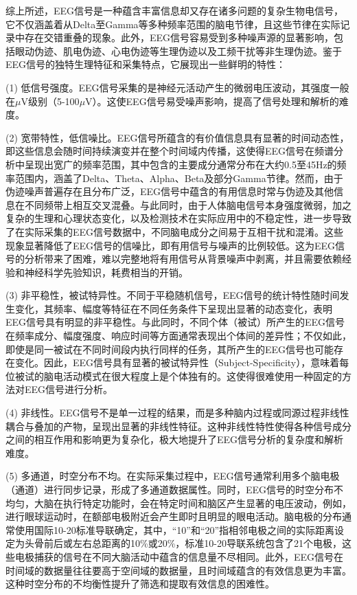 综上所述，EEG信号是一种蕴含丰富信息却又存在诸多问题的复杂生物电信号，它不仅涵盖着从Delta至Gamma等多种频率范围的脑电节律，且这些节律在实际记录中存在交错重叠的现象。此外，EEG信号容易受到多种噪声源的显著影响，包括眼动伪迹、肌电伪迹、心电伪迹等生理伪迹以及工频干扰等非生理伪迹。鉴于EEG信号的独特生理特征和采集特点，它展现出一些鲜明的特性：

(1) 低信号强度。EEG信号采集的是神经元活动产生的微弱电压波动，其强度一般在\(\mu\)V级别（5-100\(\mu\)V）\cite{SJCJ201505001}。这使EEG信号易受噪声影响，提高了信号处理和解析的难度。

(2) 宽带特性，低信噪比。EEG信号所蕴含的有价值信息具有显著的时间动态性，即这些信息会随时间持续演变并在整个时间域内传播，这使得EEG信号在频谱分析中呈现出宽广的频率范围，其中包含的主要成分通常分布在大约0.5至45Hz的频率范围内\cite{1022779250.nh}，涵盖了Delta、Theta、Alpha、Beta及部分Gamma节律。然而，由于伪迹噪声普遍存在且分布广泛，EEG信号中蕴含的有用信息时常与伪迹及其他信息在不同频带上相互交叉混叠。与此同时，由于人体脑电信号本身强度微弱，加之复杂的生理和心理状态变化，以及检测技术在实际应用中的不稳定性，进一步导致了在实际采集的EEG信号数据中，不同脑电成分之间易于互相干扰和混淆。这些现象显著降低了EEG信号的信噪比，即有用信号与噪声的比例较低。这为EEG信号的分析带来了困难，难以完整地将有用信号从背景噪声中剥离，并且需要依赖经验和神经科学先验知识，耗费相当的开销。

(3) 非平稳性，被试特异性。不同于平稳随机信号，EEG信号的统计特性随时间发生变化，其频率、幅度等特征在不同任务条件下呈现出显著的动态变化，表明EEG信号具有明显的非平稳性。与此同时，不同个体（被试）所产生的EEG信号在频率成分、幅度强度、响应时间等方面通常表现出个体间的差异性；不仅如此，即使是同一被试在不同时间段内执行同样的任务，其所产生的EEG信号也可能存在变化。因此，EEG信号具有显著的被试特异性（Subject-Specificity），意味着每位被试的脑电活动模式在很大程度上是个体独有的。这使得很难使用一种固定的方法对EEG信号进行分析。

(4) 非线性。EEG信号不是单一过程的结果，而是多种脑内过程或同源过程非线性耦合与叠加的产物，呈现出显著的非线性特征。这种非线性特性使得各种信号成分之间的相互作用和影响更为复杂化，极大地提升了EEG信号分析的复杂度和解析难度。

(5) 多通道，时空分布不均。在实际采集过程中，EEG信号通常利用多个脑电极（通道）进行同步记录，形成了多通道数据属性。同时，EEG信号的时空分布不均匀，大脑在执行特定功能时，会在特定时间和脑区产生显著的电压波动，例如，进行眼球运动时，在额部电极附近会产生即时且明显的眼电活动。脑电极的分布通常使用国际10-20标准导联确定，其中，“10”和“20”指相邻电极之间的实际距离设定为头骨前后或左右总距离的10\%或20\%，标准10-20导联系统包含了21个电极，这些电极捕获的信号在不同大脑活动中蕴含的信息量不尽相同。此外，EEG信号在时间域的数据量往往要高于空间域的数据量，且时间域蕴含的有效信息更为丰富。这种时空分布的不均衡性提升了筛选和提取有效信息的困难性。

